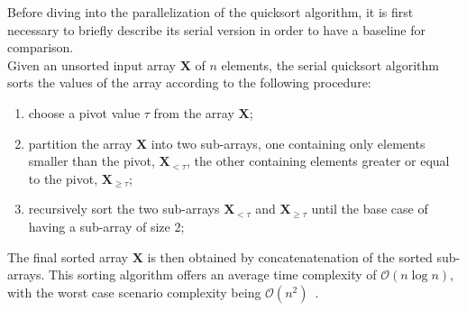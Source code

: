 \documentclass[../main.tex]{subfiles}
\begin{document}
Before diving into the parallelization of the quicksort algorithm, it is first necessary to briefly describe its serial version in order to have a baseline 
for comparison.\\
Given an unsorted input array $\mathbf{X}$ of $n$ elements, the serial quicksort algorithm sorts the values of the array according to the following procedure:

\begin{enumerate}
    \item choose a pivot value $\tau$ from the array $\mathbf{X}$;
    \item partition the array $\mathbf{X}$ into two sub-arrays, one
    containing only elements smaller than the pivot, $\mathbf{X}_{< \tau}$,
    the other containing elements greater or equal to the pivot,
    $\mathbf{X}_{\geq \tau}$;
    \item recursively sort the two sub-arrays $\mathbf{X}_{< \tau}$ and $\mathbf{X}_{\geq \tau}$ until the base case of having a sub-array of size 2;
\end{enumerate}

The final sorted array $\mathbf{X}$ is then obtained by concatenatenation of the sorted sub-arrays. This sorting algorithm offers an average time complexity of $\mathcal{O}(n \log n)$, with the worst case scenario complexity being $\mathcal{O}(n^2)$~\cite{introhpc}.\\
\end{document}
